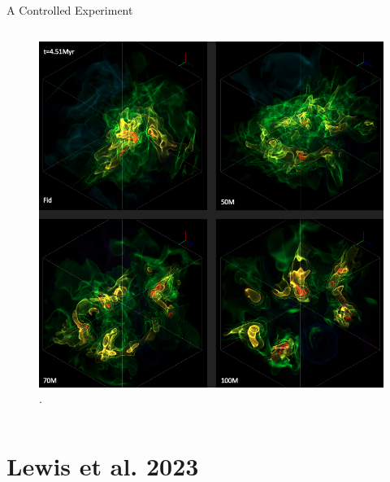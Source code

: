 \documentclass[aspectratio=169]{beamer}
\begin{document}
\begin{frame}{A Controlled Experiment}{}
\begin{columns}
\begin{column}{0.35\textwidth}
            \begin{figure}[h!]
                \centering
                \includegraphics[width=\linewidth]{../images/paper1-snapshot-volume-render.png} \\
		.
                \label{fig:volume}
            \end{figure}
        \end{column}
    \end{columns}
\end{frame} 

\section{Lewis et al. 2023}
\end{document}
